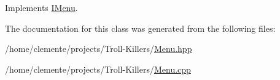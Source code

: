 Implements \hyperlink{class_i_menu_a15171c488ff899861e4c1a435bc79596}{I\+Menu}.



The documentation for this class was generated from the following files\+:\begin{DoxyCompactItemize}
\item 
/home/clemente/projects/\+Troll-\/\+Killers/\hyperlink{_menu_8hpp}{Menu.\+hpp}\item 
/home/clemente/projects/\+Troll-\/\+Killers/\hyperlink{_menu_8cpp}{Menu.\+cpp}\end{DoxyCompactItemize}
